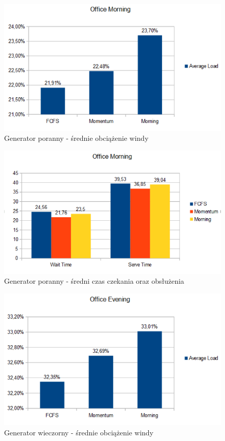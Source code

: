 \documentclass[a4paper,11pt]{article}
\begin{document}
\begin{figure}[H]
    \centering
    \caption{Generator poranny - średnie obciążenie windy}
    \includegraphics[width=\textwidth]{om_load.png}
\end{figure}

\begin{figure}[H]
    \centering
    \caption{Generator poranny - średni czas czekania oraz obsłużenia}
    \includegraphics[width=\textwidth]{om_time.png}
\end{figure}

\begin{figure}[H]
    \centering
    \caption{Generator wieczorny - średnie obciążenie windy}
    \includegraphics[width=\textwidth]{oe_load.png}
\end{figure}
\end{document}

